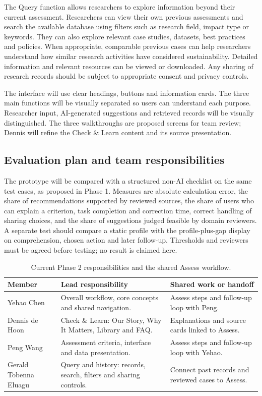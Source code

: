 The Query function allows researchers to explore information beyond their current assessment. Researchers can view their own previous assessments and search the available database using filters such as research field, impact type or keywords. They can also explore relevant case studies, datasets, best practices and policies. When appropriate, comparable previous cases can help researchers understand how similar research activities have considered sustainability. Detailed information and relevant resources can be viewed or downloaded. Any sharing of research records should be subject to appropriate consent and privacy controls.

The interface will use clear headings, buttons and information cards. The three main functions will be visually separated so users can understand each purpose. Researcher input, AI-generated suggestions and retrieved records will be visually distinguished. The three walkthroughs are proposed screens for team review; Dennis will refine the Check \& Learn content and its source presentation.


\subsection{Evaluation plan and team responsibilities}
The prototype will be compared with a structured non-AI checklist on the same test cases, as proposed in Phase 1. Measures are absolute calculation error, the share of recommendations supported by reviewed sources, the share of users who can explain a criterion, task completion and correction time, correct handling of sharing choices, and the share of suggestions judged feasible by domain reviewers. A separate test should compare a static profile with the profile-plus-gap display on comprehension, chosen action and later follow-up. Thresholds and reviewers must be agreed before testing; no result is claimed here.
\begin{table}[H]
\centering\small
\begin{tabularx}{\textwidth}{@{}>{\raggedright\arraybackslash}p{}>{\raggedright\arraybackslash}p{}X@{}}
\toprule
Member & Lead responsibility & Shared work or handoff \\
\midrule
Yehao Chen & Overall workflow, core concepts and shared navigation. & Assess steps and follow-up loop with Peng. \\
Dennis de Hoon & Check \& Learn: Our Story, Why It Matters, Library and FAQ. & Explanations and source cards linked to Assess. \\
Peng Wang & Assessment criteria, interface and data presentation. & Assess steps and follow-up loop with Yehao. \\
Gerald Tobenna Eluagu & Query and history: records, search, filters and sharing controls. & Connect past records and reviewed cases to Assess. \\
\bottomrule
\end{tabularx}
\caption{Current Phase 2 responsibilities and the shared Assess workflow.}
\label{tab:phase2-owners}
\end{table}

